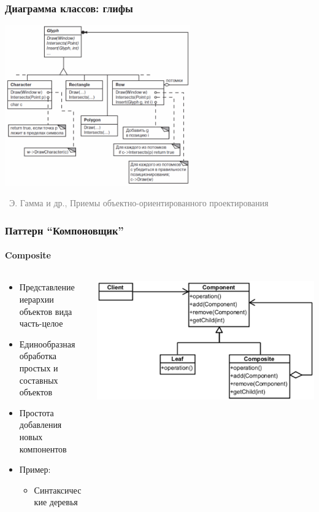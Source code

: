 \documentclass[xetex,mathserif,serif]{beamer}
\newcommand{\attribution}[1] {
	\vspace{-5mm}\begin{flushright}\begin{scriptsize}\textcolor{gray}{\textcopyright\, #1}\end{scriptsize}\end{flushright}
}
\begin{document}
	\begin{frame}
		\frametitle{Диаграмма классов: глифы}
		\begin{center}
			\includegraphics[width=0.6\textwidth]{glyphs.png}
			\attribution{Э. Гамма и др., Приемы объектно-ориентированного проектирования}
		\end{center}
	\end{frame}

	\begin{frame}
		\frametitle{Паттерн ``Компоновщик''}
		\framesubtitle{Composite}
		\begin{columns}
			\begin{column}{0.5\textwidth}
				\begin{itemize}
					\item Представление иерархии объектов вида часть-целое
					\item Единообразная обработка простых и составных объектов
					\item Простота добавления новых компонентов
					\item Пример:
					\begin{itemize}
						\item Синтаксические деревья
					\end{itemize}
				\end{itemize}
			\end{column}
			\begin{column}{0.5\textwidth}
				\begin{center}
					\includegraphics[width=\textwidth]{composite.png}
				\end{center}
			\end{column}
		\end{columns}
	\end{frame}
\end{document}
